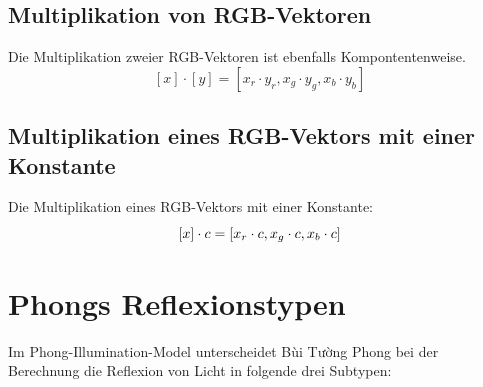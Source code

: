 \documentclass[a4paper]{scrartcl}%
\begin{document}
    \subsection{Multiplikation von RGB-Vektoren}%
    \label{sub:multiplikation_von_rgb_vektoren}
        Die Multiplikation zweier RGB-Vektoren ist ebenfalls Kompontentenweise.\\
        \begin{equation}
            \label{eq:rgb-mult}
            [x] \cdot [y] = [x_r \cdot y_r, x_g \cdot y_g, x_b \cdot y_b] 
        \end{equation}

    \subsection{Multiplikation eines RGB-Vektors mit einer Konstante}%
    \label{sub:multiplikation_eines_rgb_vektors_mit_einer_konstante}
    
        Die Multiplikation eines RGB-Vektors mit einer Konstante:\\
        \begin{equation}
            \label{eq:rgb-const}
            [x] \cdot c = [x_r \cdot c, x_g \cdot c, x_b \cdot c]\\
        \end{equation}%
    

\section{Phongs Reflexionstypen}%
\label{sec:phongs_reflexionstypen}

    Im Phong-Illumination-Model \footnotemark[2] unterscheidet Bùi Tường Phong bei der Berechnung die Reflexion von Licht in folgende drei Subtypen:\\
\end{document}
